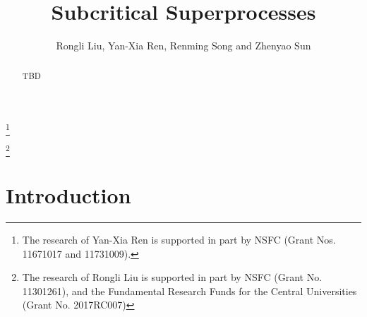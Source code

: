 \documentclass[12pt,a4paper]{amsart}
\numberwithin{equation}{section}
\theoremstyle{plain}
\theoremstyle{definition}
\theoremstyle{remark}
\begin{document}
\title {Subcritical Superprocesses }
\author[R. Liu, Y.-X. Ren, R. Song and Z. Sun]{Rongli Liu, Yan-Xia Ren, Renming Song and Zhenyao Sun}
\address{Yan-Xia Ren\\ School of Mathematical Sciences\\ Peking University\\ Beijing, P. R. China, 100871}
\thanks{The research of Yan-Xia Ren is supported in part by NSFC (Grant Nos. 11671017 and 11731009).}
\address{Rongli Liu\\ \textbf{Information about Rongli Liu}}
\thanks{The research of Rongli Liu is supported in part by NSFC (Grant No. 11301261), and the Fundamental Research Funds for the Central Universities (Grant No.  2017RC007)}
\address{Renming Song\\ Information about Renming Song}
\address{Zhenyao Sun\\ School of Mathematical Sciences\\ Peking University\\ Beijing, P. R. China, 100871}
\begin{abstract}
TBD
\end{abstract}
\maketitle
\section{Introduction}
\end{document}
